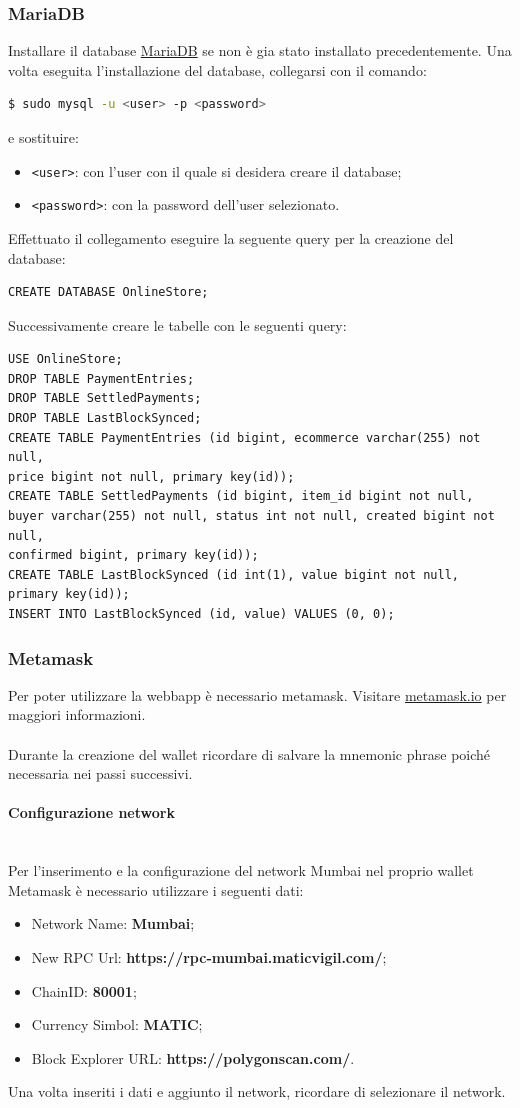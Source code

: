 \documentclass[a4paper, 12pt]{article}
\begin{document}
\subsubsection{MariaDB}
\label{sec:db}
Installare il database \href{https://mariadb.org/download/}{MariaDB} se non è gia stato installato precedentemente. Una volta eseguita l'installazione del database, collegarsi con il comando:
\begin{lstlisting}[language=bash]
  $ sudo mysql -u <user> -p <password>
\end{lstlisting}
e sostituire:
\begin{itemize}
  \item \verb|<user>|: con l'user con il quale si desidera creare il database;
  \item \verb|<password>|: con la password dell'user selezionato.
\end{itemize}
Effettuato il collegamento eseguire la seguente query per la creazione del database:
\begin{verbatim}
CREATE DATABASE OnlineStore;
\end{verbatim}
Successivamente creare le tabelle con le seguenti query:
\begin{verbatim}
USE OnlineStore;
DROP TABLE PaymentEntries;
DROP TABLE SettledPayments;
DROP TABLE LastBlockSynced;
CREATE TABLE PaymentEntries (id bigint, ecommerce varchar(255) not null,
price bigint not null, primary key(id));
CREATE TABLE SettledPayments (id bigint, item_id bigint not null,
buyer varchar(255) not null, status int not null, created bigint not null,
confirmed bigint, primary key(id));
CREATE TABLE LastBlockSynced (id int(1), value bigint not null, primary key(id));
INSERT INTO LastBlockSynced (id, value) VALUES (0, 0);
\end{verbatim}
\subsubsection{Metamask}
Per poter utilizzare la webbapp è necessario metamask. Visitare \href{https://www.metamask.io}{metamask.io} per maggiori informazioni.\\\\
Durante la creazione del wallet ricordare di salvare la mnemonic phrase poiché necessaria nei passi successivi.
\paragraph{Configurazione network}\\
Per l'inserimento e la configurazione del network Mumbai nel proprio wallet Metamask è necessario utilizzare i seguenti dati:
\begin{itemize}
\item Network Name: \textbf{Mumbai};
\item New RPC Url: \textbf{https://rpc-mumbai.maticvigil.com/};
\item ChainID: \textbf{80001};
\item Currency Simbol: \textbf{MATIC};
\item Block Explorer URL: \textbf{https://polygonscan.com/}.
\end{itemize}
Una volta inseriti i dati e aggiunto il network, ricordare di selezionare il network.
\end{document}

